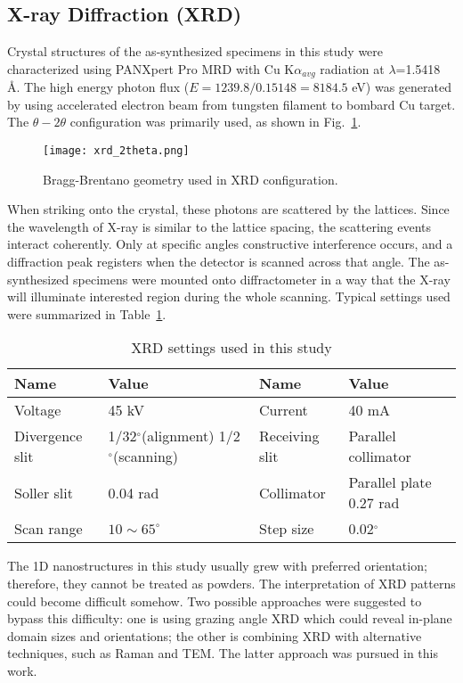 \subsection{X-ray Diffraction (XRD)}
Crystal structures of the as-synthesized specimens in this study were characterized using PANXpert Pro MRD with Cu K$\alpha_{avg}$ radiation at $\lambda$=1.5418 \si{\angstrom}. The high energy photon flux ($E = 1239.8/0.15148= 8184.5$ eV) was generated by using accelerated electron beam from tungsten filament to bombard Cu target. The $\theta-2\theta$ configuration was primarily used, as shown in Fig.~\ref{fig:ch2theta}. 
\begin{figure}[htb]
\centering
\texttt{[image: xrd\_2theta.png]}
\caption[Bragg-Brentano geometry used in XRD configuration]{Bragg-Brentano geometry used in XRD configuration.\cite{Good2000}}
\label{fig:ch2theta}
\end{figure}
When striking onto the crystal, these photons are scattered by the lattices. Since the wavelength of X-ray is similar to the lattice spacing, the scattering events interact coherently. Only at specific angles constructive interference occurs, and a diffraction peak registers when the detector is scanned across that angle. The as-synthesized specimens were mounted onto diffractometer in a way that the X-ray will illuminate interested region during the whole scanning. Typical settings used were summarized in Table~\ref{tab:ch2xrd}.
\begin{table}[htb]
\centering
\caption{XRD settings used in this study}\label{tab:ch2xrd}
\begin{tabular}{lp{1.5in}lp{1.5in}}
\toprule
Name & Value & Name & Value  \\
\midrule
Voltage   & 45 kV & Current & 40 mA \\
Divergence slit & 1/32$^\circ$(alignment) 1/2$^\circ$(scanning) & Receiving slit& Parallel collimator \\
Soller slit & 0.04 rad & Collimator & Parallel plate 0.27 rad \\
Scan range & $10 \sim 65 ^\circ$ & Step size & 0.02$^\circ$ \\
\bottomrule
\end{tabular}
\end{table}
The 1D nanostructures in this study usually grew with preferred orientation; therefore, they cannot be treated as powders. The interpretation of XRD patterns could become difficult somehow. Two possible approaches were suggested to bypass this difficulty: one is using grazing angle XRD which could reveal in-plane domain sizes and orientations;\cite{Tersigni2011,Goorsky2002} the other is combining XRD with alternative techniques, such as Raman and TEM. The latter approach was pursued in this work. 

